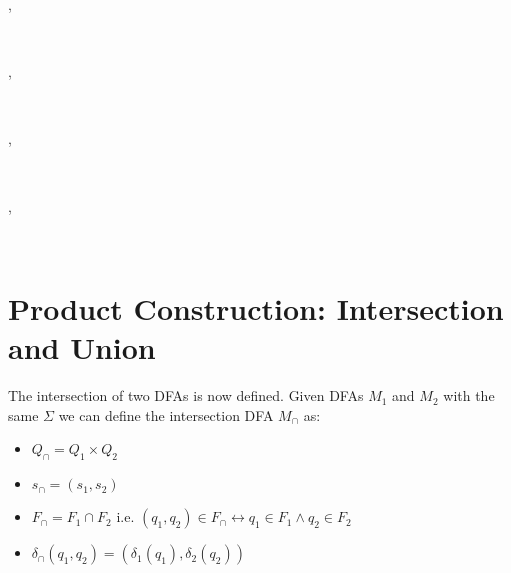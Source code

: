 \documentclass[a4paper]{article}
\begin{document}
\begin{alectryon}
\begin{sentence}
\begin{input}
    \end{input}
  \end{sentence}
  \sep
  \begin{sentence}
    \begin{input}
      ~~~~\nl
    \end{input}
  \end{sentence}
  \sep
  \begin{sentence}
    \begin{input}
      ~~~~~~\nl
      ~~~~~~~~~\nl
      ~~~~~~~~~~\nl
    \end{input}
  \end{sentence}
  \sep
  \begin{sentence}
    \begin{input}
      ~~
    \end{input}
  \end{sentence}
\end{alectryon}

\begin{alectryon}
  \sep
  \begin{sentence}
    \begin{input}
      ~
    \end{input}
  \end{sentence}
\end{alectryon}


\section{Product Construction: Intersection and Union%
  \label{product-construction-intersection-and-union}%
}

The intersection of two DFAs is now defined. Given DFAs $M_1$ and 
$M_2$ with the same $\Sigma$ we can define the intersection DFA 
$M_\cap$ as:

\begin{itemize}
\item $Q_\cap = Q_1 \times Q_2$

\item $s_\cap = (s_1, s_2)$

\item $F_\cap = F_1 \cap F_2$ i.e. $(q_1, q_2) \in F_\cap \longleftrightarrow q_1 \in F_1 \wedge q_2 \in F_2$

\item $\delta_\cap(q_1, q_2) = (\delta_1(q_1), \delta_2(q_2))$
\end{itemize}
\end{document}
